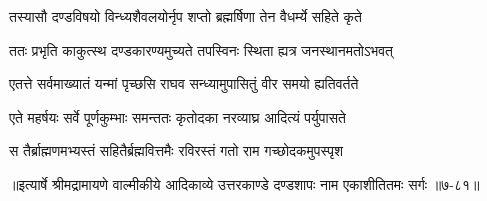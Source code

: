 \twolineshloka
{तस्यासौ दण्डविषयो विन्ध्यशैवलयोर्नृप}
{शप्तो ब्रह्मर्षिणा तेन वैधर्म्ये सहिते कृते} %

\twolineshloka
{ततः प्रभृति काकुत्स्थ दण्डकारण्यमुच्यते}
{तपस्विनः स्थिता ह्यत्र जनस्थानमतोऽभवत्} %

\twolineshloka
{एतत्ते सर्वमाख्यातं यन्मां पृच्छसि राघव}
{सन्ध्यामुपासितुं वीर समयो ह्यतिवर्तते} %

\twolineshloka
{एते महर्षयः सर्वे पूर्णकुम्भाः समन्ततः}
{कृतोदका नरव्याघ्र आदित्यं पर्युपासते} %

\twolineshloka
{स तैर्ब्राह्मणमभ्यस्तं सहितैर्ब्रह्मवित्तमैः}
{रविरस्तं गतो राम गच्छोदकमुपस्पृश} %


॥इत्यार्षे श्रीमद्रामायणे वाल्मीकीये आदिकाव्ये उत्तरकाण्डे दण्डशापः नाम एकाशीतितमः सर्गः ॥७-८१॥
